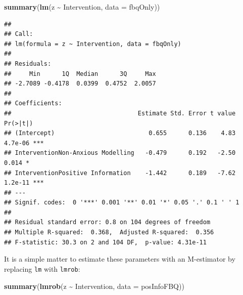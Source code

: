 \documentclass[
]{article}
\newenvironment{Shaded}{\begin{snugshade}}{\end{snugshade}}
\newcommand{\AttributeTok}[1]{\textcolor[rgb]{0.13,0.29,0.53}{#1}}
\newcommand{\FunctionTok}[1]{\textcolor[rgb]{0.13,0.29,0.53}{\textbf{#1}}}
\newcommand{\NormalTok}[1]{#1}
\newcommand{\SpecialCharTok}[1]{\textcolor[rgb]{0.81,0.36,0.00}{\textbf{#1}}}
\begin{document}
\begin{Shaded}
\begin{Highlighting}[]
    \FunctionTok{summary}\NormalTok{(}\FunctionTok{lm}\NormalTok{(z }\SpecialCharTok{\textasciitilde{}}\NormalTok{ Intervention, }\AttributeTok{data =}\NormalTok{ fbqOnly))}
\end{Highlighting}
\end{Shaded}

\begin{verbatim}
## 
## Call:
## lm(formula = z ~ Intervention, data = fbqOnly)
## 
## Residuals:
##     Min      1Q  Median      3Q     Max 
## -2.7089 -0.4178  0.0399  0.4752  2.0057 
## 
## Coefficients:
##                                   Estimate Std. Error t value Pr(>|t|)    
## (Intercept)                          0.655      0.136    4.83  4.7e-06 ***
## InterventionNon-Anxious Modelling   -0.479      0.192   -2.50    0.014 *  
## InterventionPositive Information    -1.442      0.189   -7.62  1.2e-11 ***
## ---
## Signif. codes:  0 '***' 0.001 '**' 0.01 '*' 0.05 '.' 0.1 ' ' 1
## 
## Residual standard error: 0.8 on 104 degrees of freedom
## Multiple R-squared:  0.368,  Adjusted R-squared:  0.356 
## F-statistic: 30.3 on 2 and 104 DF,  p-value: 4.31e-11
\end{verbatim}

It is a simple matter to estimate these parameters with an M-estimator by replacing \texttt{lm} with \texttt{lmrob}:

\begin{Shaded}
\begin{Highlighting}[]
    \FunctionTok{summary}\NormalTok{(}\FunctionTok{lmrob}\NormalTok{(z }\SpecialCharTok{\textasciitilde{}}\NormalTok{ Intervention, }\AttributeTok{data =}\NormalTok{ posInfoFBQ))}
\end{Highlighting}
\end{Shaded}
\end{document}
